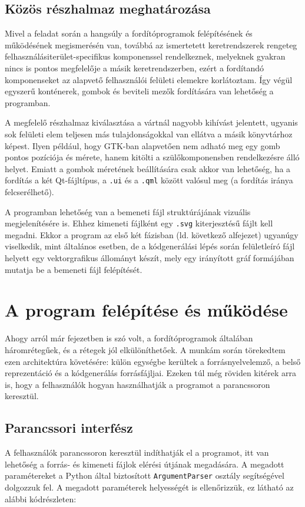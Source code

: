 \subsection{Közös részhalmaz meghatározása} \label{sect:featuresubset}
Mivel a feladat során a hangsúly a fordítóprogramok felépítésének és működésének megismerésén van, továbbá az ismertetett keretrendszerek rengeteg felhasználásiterület-specifikus komponenssel rendelkeznek, melyeknek gyakran nincs is pontos megfelelője a másik keretrendszerben, ezért a fordítandó komponenseket az alapvető felhasználói felületi elemekre korlátoztam. Így végül egyszerű konténerek, gombok és beviteli mezők fordítására van lehetőség a programban.

A megfelelő részhalmaz kiválasztása a vártnál nagyobb kihívást jelentett, ugyanis sok felületi elem teljesen más tulajdonságokkal van ellátva a másik könyvtárhoz képest. Ilyen például, hogy GTK-ban alapvetően nem adható meg egy gomb pontos pozíciója és mérete, hanem kitölti a szülőkomponensben rendelkezésre álló helyet. Emiatt a gombok méretének beállítására csak akkor van lehetőség, ha a fordítás a két Qt-fájltípus, a \texttt{.ui} és a \texttt{.qml} között valósul meg (a fordítás iránya felcserélhető).

A programban lehetőség van a bemeneti fájl struktúrájának vizuális megjelenítésére is. Ehhez kimeneti fájlként egy \texttt{.svg} kiterjesztésű fájlt kell megadni. Ekkor a program az első két fázisban (ld. következő alfejezet) ugyanúgy viselkedik, mint általános esetben, de a kódgenerálási lépés során felületleíró fájl helyett egy vektorgrafikus állományt készít, mely egy irányított gráf formájában mutatja be a bemeneti fájl felépítését.

\section{A program felépítése és működése}

Ahogy arról már  fejezetben is szó volt, a fordítóprogramok általában háromrétegűek, és a rétegek jól elkülöníthetőek. A munkám során törekedtem ezen architektúra követésére: külön egységbe kerültek a forrásnyelvelemző, a belső reprezentáció és a kódgenerálás forrásfájljai. Ezeken túl még röviden kitérek arra is, hogy a felhasználók hogyan használhatják a programot a parancssoron keresztül.


\subsection{Parancssori interfész}
A felhasználók parancssoron keresztül indíthatják el a programot, itt van lehetőség a forrás- és kimeneti fájlok elérési útjának megadására. A megadott paramétereket a Python által biztosított \texttt{ArgumentParser} osztály segítségével dolgozzuk fel. A megadott paraméterek helyességét is ellenőrizzük, ez látható az alábbi kódrészleten:

